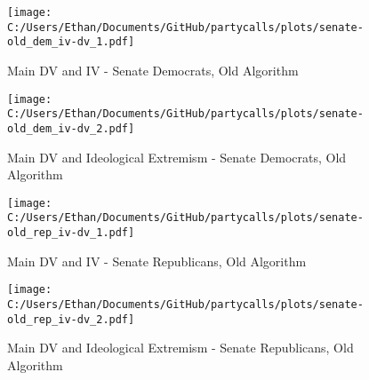 \documentclass[12pt]{article}
\begin{document}
\begin{figure}[h]
	\caption{Main DV and IV - Senate Democrats, Old Algorithm}
	\texttt{[image: C:/Users/Ethan/Documents/GitHub/partycalls/plots/senate-old\_dem\_iv-dv\_1.pdf]}
\end{figure}

\begin{figure}[h]
	\caption{Main DV and Ideological Extremism - Senate Democrats, Old Algorithm}
	\texttt{[image: C:/Users/Ethan/Documents/GitHub/partycalls/plots/senate-old\_dem\_iv-dv\_2.pdf]}
\end{figure}

\begin{figure}[h]
	\caption{Main DV and IV - Senate Republicans, Old Algorithm}
	\texttt{[image: C:/Users/Ethan/Documents/GitHub/partycalls/plots/senate-old\_rep\_iv-dv\_1.pdf]}
\end{figure}

\begin{figure}[h]
	\caption{Main DV and Ideological Extremism - Senate Republicans, Old Algorithm}
	\texttt{[image: C:/Users/Ethan/Documents/GitHub/partycalls/plots/senate-old\_rep\_iv-dv\_2.pdf]}
\end{figure}
\end{document}
